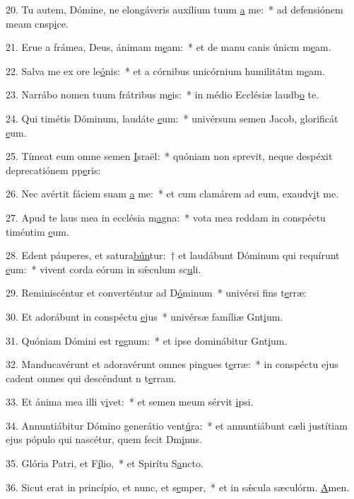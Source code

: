 20. Tu autem, Dómine, ne elongáveris auxílium tuum \uline{a} me:~* ad defensiónem meam cnsp\uline{i}ce.\par 
21. Erue a frámea, Deus, ánimam m\uline{e}am:~* et de manu canis únicm m\uline{e}am.\par 
22. Salva me ex ore le\uline{ó}nis:~* et a córnibus unicórnium humilitátm m\uline{e}am.\par 
23. Narrábo nomen tuum frátribus m\uline{e}is:~* in médio Ecclésiæ laudb\uline{o} te.\par 
24. Qui timétis Dóminum, laudáte \uline{e}um:~* univérsum semen Jacob, glorificát \uline{e}um.\par 
25. Tímeat eum omne semen \uline{I}sraël:~* quóniam non sprevit, neque despéxit deprecatiónem pp\uline{e}ris:\par 
26. Nec avértit fáciem suam \uline{a} me:~* et cum clamárem ad eum, exaudv\uline{i}t me.\par 
27. Apud te laus mea in ecclésia m\uline{a}gna:~* vota mea reddam in conspéctu timéntim \uline{e}um.\par 
28. Edent páuperes, et satura\uline{bún}tur:~† et laudábunt Dóminum qui requírunt \uline{e}um:~* vivent corda eórum in sǽculum sc\uline{u}li.\par 
29. Reminiscéntur et converténtur ad D\uline{ó}minum~* univérsi fins t\uline{e}rræ:\par 
30. Et adorábunt in conspéctu \uline{e}jus~* univérsæ famíliæ Gnt\uline{i}um.\par 
31. Quóniam Dómini est r\uline{e}gnum:~* et ipse dominábitur Gnt\uline{i}um.\par 
32. Manducavérunt et adoravérunt omnes pingues t\uline{e}rræ:~* in conspéctu ejus cadent omnes qui descéndunt n t\uline{e}rram.\par 
33. Et ánima mea illi v\uline{i}vet:~* et semen meum sérvit \uline{i}psi.\par 
34. Annuntiábitur Dómino generátio vent\uline{ú}ra:~* et annuntiábunt cæli justítiam ejus pópulo qui nascétur, quem fecit Dm\uline{i}nus.\par 
35. Glória Patri, et F\uline{í}lio,~* et Spirítu S\uline{a}ncto.\par 
36. Sicut erat in princípio, et nunc, et s\uline{e}mper,~* et in sǽcula sæculórm. \uline{A}men.\par 
